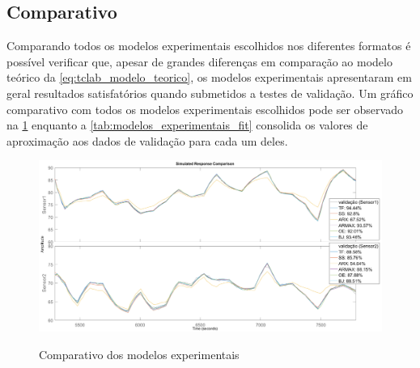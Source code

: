 \subsection{Comparativo}
\label{subsec:modelos_experimentais_comparativo}

Comparando todos os modelos experimentais escolhidos nos diferentes formatos é possível verificar que,
apesar de grandes diferenças em comparação ao modelo teórico da \cref{eq:tclab_modelo_teorico}, os
modelos experimentais apresentaram em geral resultados satisfatórios quando submetidos a testes de validação.
Um gráfico comparativo com todos os modelos experimentais escolhidos pode ser observado na 
\cref{fig:comparativo_modelos_experimentais} enquanto a \cref{tab:modelos_experimentais_fit} consolida os valores de aproximação aos dados de
validação para cada um deles. 

\begin{figure}[h]
	\caption{Comparativo dos modelos experimentais}
	\begin{center}
		\includegraphics[width=1.00\textwidth]{./5_images/tclabsp-models-ALL-compare.png} 
		\label{fig:comparativo_modelos_experimentais}
	\end{center}
	\centering
\end{figure}

